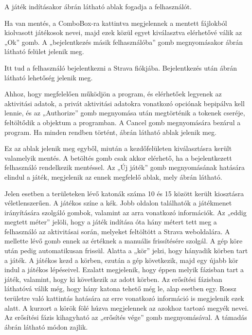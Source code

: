 A játék indításakor  ábrán látható ablak fogadja a felhasználót.



Ha van mentés, a ComboBox-ra kattintva megjelennek a mentett fájlokból kiolvasott játékosok nevei, majd ezek közül egyet kiválasztva elérhetővé válik az „Ok” gomb.
A „bejelentkezés másik felhasználóba” gomb megnyomásakor  ábrán látható felület jelenik meg.



Itt tud a felhasználó bejelentkezni a Strava fiókjába.
Bejelentkezés után  ábrán látható lehetőség jelenik meg.




Ahhoz, hogy megfelelően működjön a program, és elérhetőek legyenek az aktivitási adatok, a privát aktivitási adatokra vonatkozó opciónak bepipálva kell lennie, és az „Authorize” gomb megnyomása után megtörténik a tokenek cseréje, feltöltődik a  objektum a programban.
A Cancel gomb megnyomására bezárul a program.
Ha minden rendben történt,  ábrán látható ablak jelenik meg. 



Ez az ablak jelenik meg egyből, miután a kezdőfelületen kiválasztásra került valamelyik mentés.
A betöltés gomb csak akkor elérhető, ha a bejelentkezett felhasználó rendelkezik mentéssel.
Az „Új játék” gomb megnyomásának hatására elindul a játék, megjelenik az ennek megfelelő ablak, mely  ábrán látható. 


Jelen esetben a területeken lévő katonák száma 10 és 15 között került kiosztásra véletlenszerűen.
A játékos színe a kék.
Jobb oldalon találhatók a játékmenet irányítására szolgáló gombok, valamint az arra vonatkozó információk.
Az „eddig megtett méter” jelöli, hogy a játék indítása óta hány métert tett meg a felhasználó az aktivitásai során, melyeket feltöltött a Strava weboldalára.
A mellette lévő gomb ennek az értéknek a manuális frissítésére szolgál.
A gép köre után pedig automatikusan frissül.
Alatta a „kör” jelzi, hogy hányadik körben tart a játék.
A játékos kezd a körben, ezután a gép következik, majd egy újabb kör indul a játékos lépéseivel.
Ezalatt megjelenik, hogy éppen melyik fázisban tart a játék, valamint, hogy ki következik az adott körben.
Az erősítési fázisban láthatóvá válik még, hogy hány katona tehető még le, alap esetben egy.
Rossz területre való kattintás hatására az erre vonatkozó információ is megjelenik ezek alatt.
A kurzort a körök fölé húzva megjelennek az azokhoz tartozó megyék nevei.
Az erősítési fázis kihagyható az „erősítés vége” gomb megnyomásával.
A támadás  ábrán látható módon zajlik.

